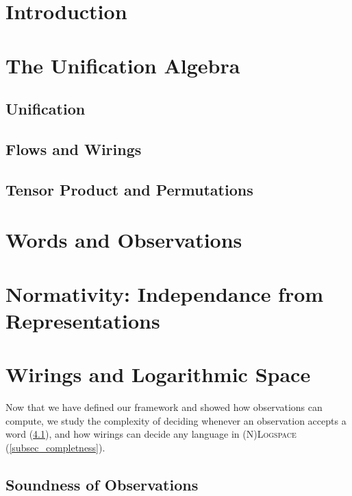 \section*{Introduction}


\section{The Unification Algebra}\label{sec_unification}
	\subsection{Unification}
	
	\subsection{Flows and Wirings}
	
	\subsection{Tensor Product and Permutations}\label{permutation}
	

\section{Words and Observations}\label{sec_words}
	
	
	
\section{Normativity: Independance from Representations}\label{sec_normativity}
	

\section{Wirings and Logarithmic Space}\label{sec_logspace}
	Now that we have defined our framework and showed how observations can compute, we study the complexity of deciding whenever an observation accepts a word (\ref{subsec_soundness}), and how wirings can decide any language in \textsc{(N)Logspace} (\ref{subsec_completness}).
	\subsection{Soundness of Observations}
	\label{subsec_soundness}
	
